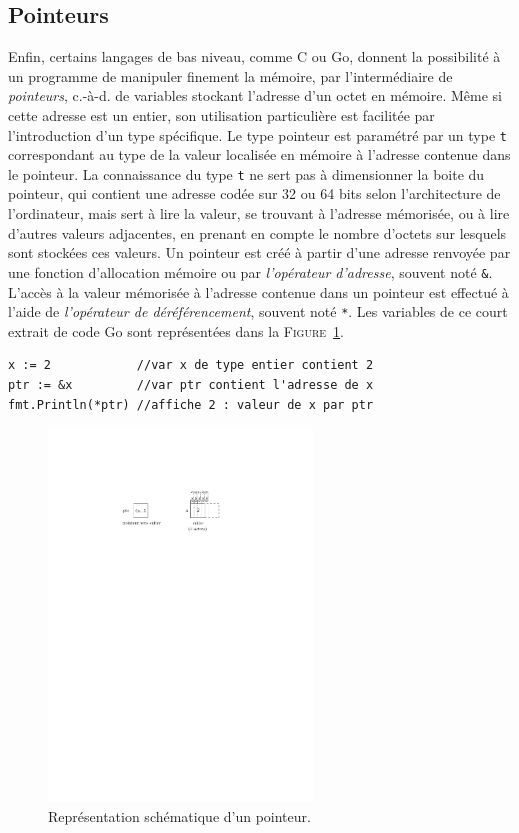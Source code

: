 \documentclass[a4paper,francais]{insalyon}
\newcommand{\cad}{c.-à-d.}
\begin{document}
\subsection{Pointeurs}

Enfin, certains langages de bas niveau, comme C ou Go, donnent la possibilité à un programme de manipuler finement la mémoire, par l'intermédiaire de \emph{pointeurs}, {\cad} de variables stockant l'adresse d'un octet en mémoire. Même si cette adresse est un entier, son utilisation particulière est facilitée par l'introduction d'un type spécifique. Le type pointeur est paramétré par un type \texttt{t} correspondant au type de la valeur localisée en mémoire à l'adresse contenue dans le pointeur. La connaissance du type \texttt{t} ne sert pas à dimensionner la boite du pointeur, qui contient une adresse codée sur 32 ou 64 bits selon l'architecture de l'ordinateur, mais sert à lire la valeur, se trouvant à l'adresse mémorisée, ou à lire d'autres valeurs adjacentes, en prenant en compte le nombre d'octets sur lesquels sont stockées ces valeurs. Un pointeur est créé à partir d'une adresse renvoyée par une fonction d'allocation mémoire ou par \emph{l'opérateur d'adresse}, souvent noté \verb!&!. L'accès à la valeur mémorisée à l'adresse contenue dans un pointeur est effectué à l'aide de \emph{l'opérateur de déréférencement}, souvent noté \verb!*!. Les variables de ce court extrait de code Go sont représentées dans la \textsc{Figure}~\ref{fig:pointeur}.  
\begin{verbatim}
x := 2            //var x de type entier contient 2
ptr := &x         //var ptr contient l'adresse de x
fmt.Println(*ptr) //affiche 2 : valeur de x par ptr 
\end{verbatim}

\begin{figure}[htbp]
  \centering
  \includegraphics[width=7cm]{pointeur}
  \caption{Représentation schématique d'un pointeur.}  
  \label{fig:pointeur}
\end{figure}
\end{document}
